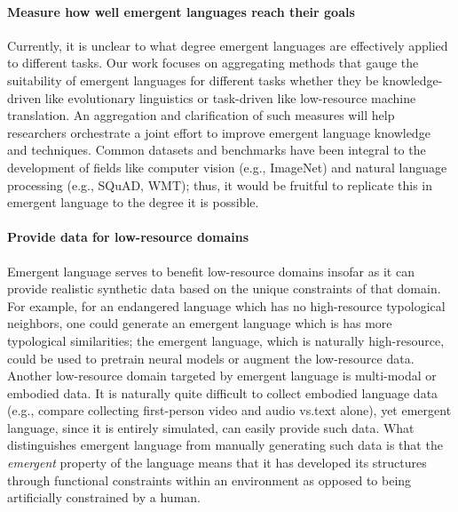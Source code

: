 \paragraph{Measure how well emergent languages reach their goals}
Currently, it is unclear to what degree emergent languages are effectively applied to different tasks.
Our work focuses on aggregating methods that gauge the suitability of emergent languages for different tasks whether they be knowledge-driven like evolutionary linguistics or task-driven like low-resource machine translation.
An aggregation and clarification of such measures will help researchers orchestrate a joint effort to improve emergent language knowledge and techniques.
Common datasets and benchmarks have been integral to the development of fields like computer vision (e.g., ImageNet) and natural language processing (e.g., SQuAD, WMT); thus, it would be fruitful to replicate this in emergent language to the degree it is possible.

\paragraph{Provide data for low-resource domains}
Emergent language serves to benefit low-resource domains insofar as it can provide realistic synthetic data based on the unique constraints of that domain.
For example, for an endangered language which has no high-resource typological neighbors, one could generate an emergent language which is has more typological similarities; the emergent language, which is naturally high-resource, could be used to pretrain neural models or augment the low-resource data.
Another low-resource domain targeted by emergent language is multi-modal or embodied data.
It is naturally quite difficult to collect embodied language data (e.g., compare collecting first-person video and audio vs.\@ text alone), yet emergent language, since it is entirely simulated, can easily provide such data.
What distinguishes emergent language from manually generating such data is that the \emph{emergent} property of the language means that it has developed its structures through functional constraints within an environment as opposed to being artificially constrained by a human.

